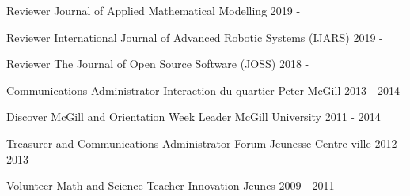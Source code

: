 \begin{cvhonors}

\cvhonor
{Reviewer}
{Journal of Applied Mathematical Modelling}
{}
{2019 - }

\cvhonor
{Reviewer}
{International Journal of Advanced Robotic Systems (IJARS)}
{}
{2019 - }

\cvhonor
{Reviewer}
{The Journal of Open Source Software (JOSS)}
{}
{2018 - }

\cvhonor
{Communications Administrator}
{Interaction du quartier Peter-McGill}
{}
{2013 - 2014}

\cvhonor
{Discover McGill and Orientation Week Leader}
{McGill University}
{}
{2011 - 2014}

\cvhonor
{Treasurer and Communications Administrator}
{Forum Jeunesse Centre-ville}
{}
{2012 - 2013}

\cvhonor
{Volunteer Math and Science Teacher}
{Innovation Jeunes}
{}
{2009 - 2011}

\end{cvhonors}

